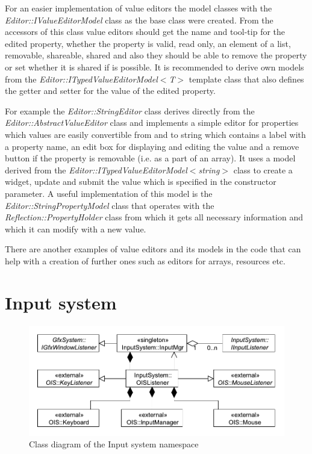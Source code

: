 \documentclass[a4paper, 12pt]{report}
\begin{document}
For an easier implementation of value editors the model classes with the \emph{Editor::IValueEditorModel} class as the base class were created. From the accessors of this class value editors should get the name and tool-tip for the edited property, whether the property is valid, read only, an element of a list, removable, shareable, shared and also they should be able to remove the property or set whether it is shared if is possible. It is recommended to derive own models from the \emph{Editor::ITypedValueEditor\-Model$<$T$>$} template class that also defines the getter and setter for the value of the edited property.

For example the \emph{Editor::StringEditor} class derives directly from the \emph{Editor::AbstractValueEditor} class and implements a simple editor for properties which values are easily convertible from and to string which contains a label with a property name, an edit box for displaying and editing the value and a remove button if the property is removable (i.e. as a part of an array). It uses a model derived from the \emph{Editor::ITypedValueEditorModel$<$string$>$} class to create a widget, update and submit the value which is specified in the constructor parameter. A useful implementation of this model is the \emph{Editor::StringPropertyModel} class that operates with the \emph{Reflection::Property\-Holder} class from which it gets all necessary information and which it can modify with a new value.

There are another examples of value editors and its models in the code that can help with a creation of further ones such as editors for arrays, resources etc.

\chapter{Input system}

\begin{figure}[htbp]
	\centering
		\includegraphics[width=1\textwidth]{InputSystemClassDiagram.pdf}
	\caption{Class diagram of the Input system namespace}
	\label{fig:inputsystem-diagram}
\end{figure}
\end{document}

